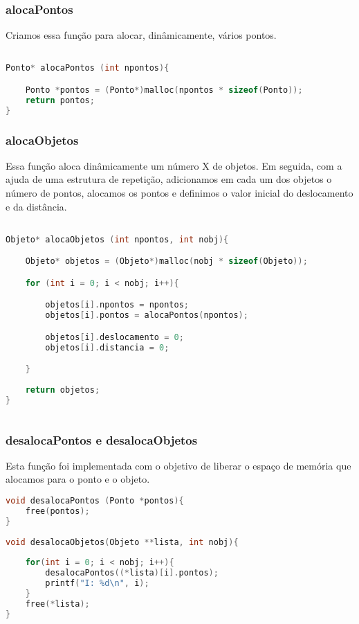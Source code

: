 \documentclass{article}
\begin{document}
\subsubsection{alocaPontos}

Criamos essa função para alocar, dinâmicamente, vários pontos.

\begin{lstlisting}[caption={Função alocaPontos},label={lst:cod2},language=C]

Ponto* alocaPontos (int npontos){

    Ponto *pontos = (Ponto*)malloc(npontos * sizeof(Ponto));
    return pontos;
}

\end{lstlisting}

\subsubsection{alocaObjetos}

Essa função aloca dinâmicamente um número X de objetos. Em seguida, com a ajuda de
uma estrutura de repetição, adicionamos em cada um dos objetos o número de pontos,
alocamos os pontos e definimos o valor inicial do deslocamento e da distância.

\begin{lstlisting}[caption={Função alocaObjetos},label={lst:cod3},language=C]

Objeto* alocaObjetos (int npontos, int nobj){

    Objeto* objetos = (Objeto*)malloc(nobj * sizeof(Objeto));

    for (int i = 0; i < nobj; i++){

        objetos[i].npontos = npontos;
        objetos[i].pontos = alocaPontos(npontos);

        objetos[i].deslocamento = 0;
        objetos[i].distancia = 0;

    }
    
    return objetos;
}
    
    \end{lstlisting}

\subsubsection{desalocaPontos e desalocaObjetos}
Esta função foi implementada com o objetivo de liberar o espaço de memória que alocamos para o ponto e o objeto.

\begin{lstlisting}[caption={Funções desalocaPontos e desalocaObjetos},label={lst:cod4},language=C]
void desalocaPontos (Ponto *pontos){
    free(pontos);
}
    
void desalocaObjetos(Objeto **lista, int nobj){
    
    for(int i = 0; i < nobj; i++){
        desalocaPontos((*lista)[i].pontos);
        printf("I: %d\n", i);
    }
    free(*lista);
}

\end{lstlisting}
\end{document}
